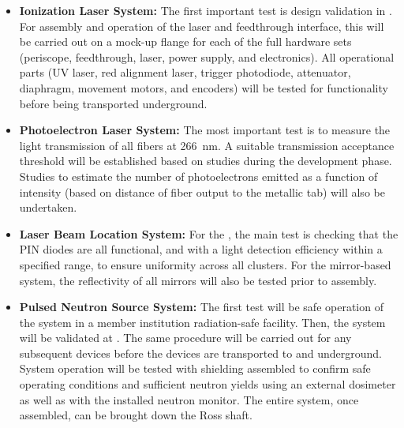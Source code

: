 \begin{itemize}
    \item {\bf Ionization Laser System:} The first %
    important test is  design validation in . For assembly and operation of the laser and feedthrough interface, this will be carried out on a mock-up flange for each of the full hardware sets (periscope, feedthrough, laser, power supply, and electronics). All operational parts (UV laser, red alignment laser, trigger photodiode, attenuator, diaphragm, movement motors, and encoders) will be tested for functionality before being transported underground.
    \item {\bf Photoelectron Laser System:} The most important test is to measure the light transmission of all fibers at \SI{266}{\nano\m}. A suitable transmission acceptance threshold will be established based on studies during the development phase. Studies to estimate the number of photoelectrons emitted as a function of intensity (based on distance of fiber output to the metallic tab) will also be undertaken.
    \item {\bf Laser Beam Location System:} For the , the main test is checking that the PIN diodes are all functional, and with a light detection efficiency within a specified range, to ensure uniformity across all clusters. For the mirror-based system, the reflectivity of all mirrors will also be tested prior to assembly.
    \item {\bf Pulsed Neutron Source System:} The first test will be safe operation of the system in a member institution radiation-safe facility. Then, the system will be validated at . The same procedure %
    will be carried out for any subsequent devices before the devices are transported to  and underground. System operation will be tested with shielding assembled to confirm safe operating conditions and sufficient neutron yields using an external dosimeter as well as with the installed neutron monitor. The entire system, once assembled, can be brought down the Ross shaft.
\end{itemize}
